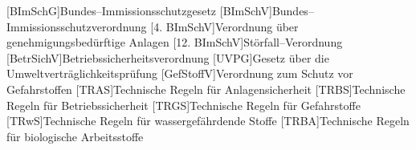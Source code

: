 \begin{acronym}[12. BImSchV]
	[BImSchG]{Bundes--Immissionsschutzgesetz}
	[BImSchV]{Bundes--Immissionsschutzverordnung}
  [4. BImSchV]{Verordnung \"uber genehmigungsbed\"urftige Anlagen}
	[12. BImSchV]{St\"orfall--Verordnung}
	[BetrSichV]{Betriebssicherheitsverordnung}
	[UVPG]{Gesetz \"uber die Umweltvertr\"aglichkeitspr\"ufung}
	[GefStoffV]{Verordnung zum Schutz vor Gefahrstoffen}
	[TRAS]{Technische Regeln f\"ur Anlagensicherheit}
	[TRBS]{Technische Regeln f\"ur Betriebssicherheit}
	[TRGS]{Technische Regeln f\"ur Gefahrstoffe}
	[TRwS]{Technische Regeln f\"ur wassergef\"ahrdende Stoffe}
	[TRBA]{Technische Regeln f\"ur biologische Arbeitsstoffe}
\end{acronym}